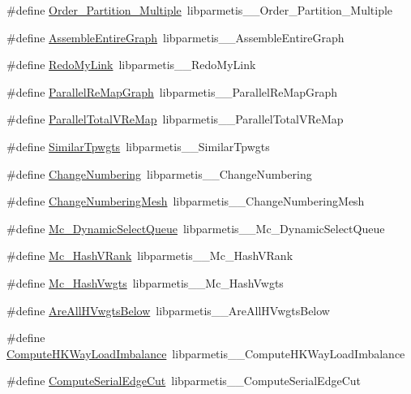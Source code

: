 \begin{DoxyCompactItemize}
\item 
\#define \hyperlink{a00960_a5c15dabbf9ac0524149362ac5c62c8b0}{Order\+\_\+\+Partition\+\_\+\+Multiple}~libparmetis\+\_\+\+\_\+\+Order\+\_\+\+Partition\+\_\+\+Multiple
\item 
\#define \hyperlink{a00960_a96104c6ed811d039c29cac7733621b52}{Assemble\+Entire\+Graph}~libparmetis\+\_\+\+\_\+\+Assemble\+Entire\+Graph
\item 
\#define \hyperlink{a00960_a8ac85bd7d75c36192cdd3216b5b8cc7b}{Redo\+My\+Link}~libparmetis\+\_\+\+\_\+\+Redo\+My\+Link
\item 
\#define \hyperlink{a00960_afc7d013824f3c43493da1c0c709fae70}{Parallel\+Re\+Map\+Graph}~libparmetis\+\_\+\+\_\+\+Parallel\+Re\+Map\+Graph
\item 
\#define \hyperlink{a00960_a03e49d682cfd689975e51f4c1fb6d5a0}{Parallel\+Total\+V\+Re\+Map}~libparmetis\+\_\+\+\_\+\+Parallel\+Total\+V\+Re\+Map
\item 
\#define \hyperlink{a00960_a3eff836fff818d360a4b61edecfea48e}{Similar\+Tpwgts}~libparmetis\+\_\+\+\_\+\+Similar\+Tpwgts
\item 
\#define \hyperlink{a00960_a2adbb6270a012594c2419689f414aec6}{Change\+Numbering}~libparmetis\+\_\+\+\_\+\+Change\+Numbering
\item 
\#define \hyperlink{a00960_a98a1cf70f7ffaec2306695dd3425cade}{Change\+Numbering\+Mesh}~libparmetis\+\_\+\+\_\+\+Change\+Numbering\+Mesh
\item 
\#define \hyperlink{a00960_a0a2c67ece9c46fed3e3fb2833b1aea5d}{Mc\+\_\+\+Dynamic\+Select\+Queue}~libparmetis\+\_\+\+\_\+\+Mc\+\_\+\+Dynamic\+Select\+Queue
\item 
\#define \hyperlink{a00960_a35a990c9d9e5fc983221cc8d321ae16b}{Mc\+\_\+\+Hash\+V\+Rank}~libparmetis\+\_\+\+\_\+\+Mc\+\_\+\+Hash\+V\+Rank
\item 
\#define \hyperlink{a00960_a32f4cb4445b7dd4c109db18ff0a3efab}{Mc\+\_\+\+Hash\+Vwgts}~libparmetis\+\_\+\+\_\+\+Mc\+\_\+\+Hash\+Vwgts
\item 
\#define \hyperlink{a00960_a8df0c8ccd480aa629086053aeb0f9636}{Are\+All\+H\+Vwgts\+Below}~libparmetis\+\_\+\+\_\+\+Are\+All\+H\+Vwgts\+Below
\item 
\#define \hyperlink{a00960_a56caf6e542ef3ebf666495c16bec9b9e}{Compute\+H\+K\+Way\+Load\+Imbalance}~libparmetis\+\_\+\+\_\+\+Compute\+H\+K\+Way\+Load\+Imbalance
\item 
\#define \hyperlink{a00960_adb17a92b8ab0636086fa31f2f418a0ce}{Compute\+Serial\+Edge\+Cut}~libparmetis\+\_\+\+\_\+\+Compute\+Serial\+Edge\+Cut

\end{DoxyCompactItemize}
